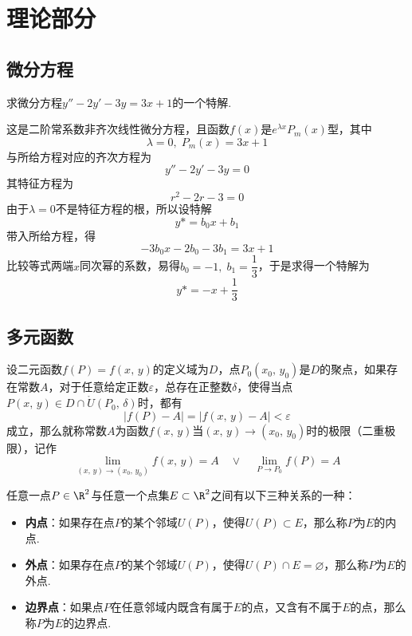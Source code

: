\documentclass[12pt, a4paper, oneside, UTF8]{ctexbook}
\begin{document}
\else
\fi
\chapter{理论部分}

\section{微分方程}
\begin{example}
    求微分方程$y''-2y'-3y=3x+1$的一个特解.
\end{example}
\begin{solution}
    这是二阶常系数非齐次线性微分方程，且函数$f(x)$是$e^{\lambda{x}}P_m(x)$型，其中
    \[
        \lambda = 0,\;P_m(x) = 3x+1
    \]
    与所给方程对应的齐次方程为
    \[
        y''-2y'-3y=0
    \]
    其特征方程为
    \[
        r^2-2r-3 = 0
    \]
    由于$\lambda = 0$不是特征方程的根，所以设特解
    \[
        y* = b_0 x + b_1
    \]
    带入所给方程，得
    \[
        -3b_0 x - 2b_0 - 3b_1 = 3x+1
    \]
    比较等式两端$x$同次幂的系数，易得$b_0 = -1,\;b_1 = \dfrac{1}{3}$，于是求得一个特解为
    \[
        y* = -x + \frac{1}{3}
    \]
\end{solution}

\section{多元函数}
\begin{defn}
    设二元函数$f(P) = f(x,\,y)$的定义域为$D$，点$P_0(x_0,\,y_0)$是$D$的聚点，如果存在常数$A$，对于任意给定正数$\varepsilon$，总存在正整数$\delta$，使得当点$P(x,\,y) \in D \cap \mathring{U}(P_0,\,\delta)$时，都有
    \[
        |f(P)-A| = |f(x,\,y) - A| < \varepsilon
    \]
    成立，那么就称常数$A$为函数$f(x,\,y)$当$(x,\,y) \to (x_0,\,y_0)$时的极限（二重极限），记作
    \[
        \lim_{(x,\,y) \to (x_0,\,y_0)}f(x,\,y) = A \quad \lor \quad \lim_{P \to P_0}f(P) = A
    \]
\end{defn}


任意一点$P \in \R^2$与任意一个点集$E \subset \R^2$之间有以下三种关系的一种：
\begin{itemize}[leftmargin=45pt]
    \item \textbf{内点}：如果存在点$P$的某个邻域$U(P)$，使得$U(P) \subset E$，那么称$P$为$E$的内点.
    \item \textbf{外点}：如果存在点$P$的某个邻域$U(P)$，使得$U(P) \cap E = \varnothing$，那么称$P$为$E$的外点.
    \item \textbf{边界点}：如果点$P$在任意邻域内既含有属于$E$的点，又含有不属于$E$的点，那么称$P$为$E$的边界点.
\end{itemize}

\ifx\allfiles\undefined
\end{document}
